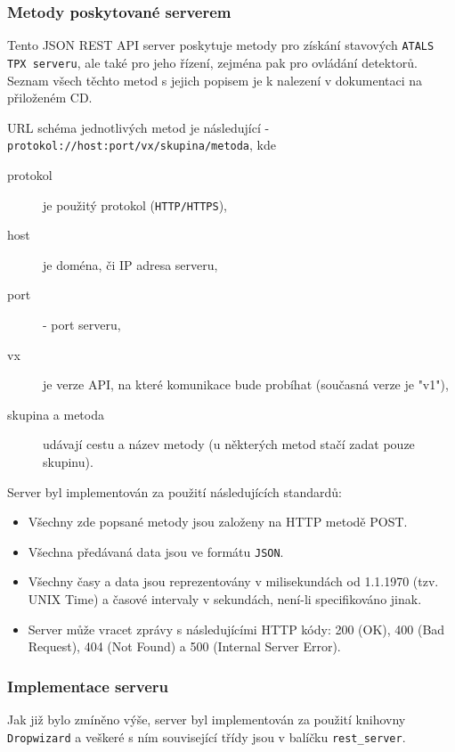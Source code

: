 \subsubsection{Metody poskytované serverem}
Tento JSON REST API server poskytuje metody pro získání stavových \texttt{ATALS TPX serveru}, ale také pro jeho řízení, zejména pak pro ovládání detektorů. Seznam všech těchto metod s jejich popisem je k nalezení v dokumentaci na přiloženém CD.

URL schéma jednotlivých metod je následující - \texttt{protokol://host:port/vx/skupina/metoda}, kde
\begin{description}
	\item[protokol] je použitý protokol (\texttt{HTTP/HTTPS}),
	\item[host] je doména, či IP adresa serveru,
	\item[port] - port serveru,
	\item[vx] je verze API, na které komunikace bude probíhat (současná verze je "v1"),
	\item[skupina a metoda] udávají cestu a název metody (u některých metod stačí zadat pouze skupinu).
\end{description}

Server byl implementován za použití následujících standardů:
\begin{itemize}
	\item Všechny zde popsané metody jsou založeny na HTTP metodě POST.
	\item Všechna předávaná data jsou ve formátu \texttt{JSON}. 
	\item Všechny časy a data jsou reprezentovány v milisekundách od 1.1.1970 (tzv. UNIX Time) a časové intervaly v sekundách, není-li specifikováno jinak.
	\item Server může vracet zprávy s následujícími HTTP kódy: 200 (OK), 400 (Bad Request), 404 (Not Found) a 500 (Internal Server Error).
\end{itemize}


\subsubsection{Implementace serveru}\label{atlas:cont:api:init}
Jak již bylo zmíněno výše, server byl implementován za použití knihovny \texttt{Dropwizard} a veškeré s ním související třídy jsou v balíčku \texttt{rest\_server}.

